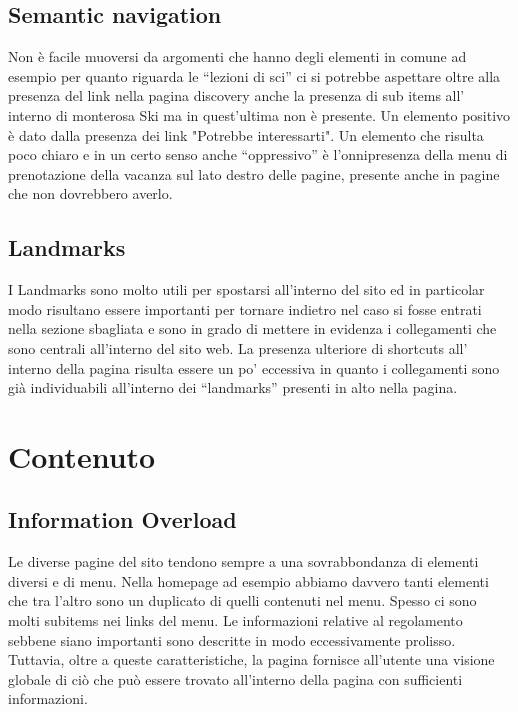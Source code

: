         \subsection{Semantic navigation}
        Non è facile muoversi da argomenti che hanno degli elementi in comune ad
        esempio per quanto riguarda le “lezioni di sci” ci si potrebbe aspettare
        oltre alla presenza del link nella pagina discovery anche la presenza di
        sub items all’ interno di monterosa Ski ma in quest'ultima non è
        presente. Un elemento positivo è dato dalla presenza dei link "Potrebbe
        interessarti".
        Un elemento che risulta poco chiaro e in un certo senso anche
        “oppressivo” è l’onnipresenza della menu di prenotazione della vacanza
        sul lato destro delle pagine, presente anche in pagine che non
        dovrebbero averlo.
        \subsection{Landmarks}
        I Landmarks sono molto utili per spostarsi all'interno del sito ed in
        particolar modo risultano essere importanti per tornare indietro nel
        caso si fosse entrati nella sezione sbagliata e sono in grado di mettere
        in evidenza i collegamenti che sono centrali all'interno del sito web.
        La presenza ulteriore di shortcuts all’ interno della pagina risulta
        essere un po’ eccessiva in quanto i collegamenti sono già individuabili
        all'interno dei “landmarks” presenti in alto nella pagina.
  
    \section{Contenuto}
        \subsection{Information Overload}
        Le diverse pagine del sito tendono sempre a una sovrabbondanza di
        elementi diversi e di menu. 
        Nella homepage ad esempio abbiamo davvero tanti elementi che tra l’altro
        sono un duplicato di quelli contenuti nel menu. Spesso ci sono molti
        subitems nei links del menu.
        Le informazioni relative al regolamento sebbene siano importanti sono
        descritte in modo eccessivamente prolisso.
        Tuttavia, oltre a queste caratteristiche, la pagina fornisce all'utente
        una visione globale di ciò che può essere trovato all'interno della
        pagina con sufficienti informazioni.


